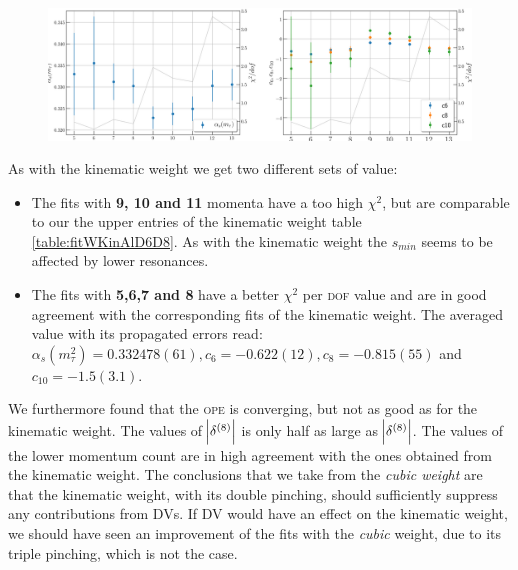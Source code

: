\documentclass[../../index.tex]{subfiles}
\begin{document}
\begin{figure}
  \centering
  \includegraphics[width=\textwidth]{./images/fitWCubeAlD6D8D10.png}
  \label{fig:fitWCubeAlpha}
\end{figure}
As with the kinematic weight we get two different sets of value:
\begin{itemize}
  \item The fits with \textbf{9, 10 and 11} momenta have a too high $\chi^2$,
    but are comparable to our the upper entries of the kinematic weight table
    \cref{table:fitWKinAlD6D8}. As with the kinematic weight the $s_{min}$ seems
    to be affected by lower resonances.
  \item The fits with \textbf{5,6,7 and 8} have a better $\chi^2$ per
    \textsc{dof} value and are in good agreement with the corresponding fits of
    the kinematic weight. The averaged value with its propagated errors read:
    $\alpha_s(m_\tau^2)=0.332478(61), c_6=-0.622(12), c_8=-0.815(55)$ and $c_{10}=-1.5(3.1)$.
\end{itemize}
We furthermore found that the \textsc{ope} is converging, but not as good as for
the kinematic weight. The values of $\abs{\delta^{(8)}}$ is only half as large
as $\abs{\delta^{(8)}}$.
The values of the lower momentum count are in high agreement with the
ones obtained from the kinematic weight. The
conclusions that we take from the \textit{cubic weight} are that the kinematic
weight, with its double pinching, should sufficiently suppress any contributions
from \textsc{DV}s. If \textsc{DV} would have an effect on the kinematic weight,
we should have seen an improvement of the fits with the \textit{cubic} weight,
due to its triple pinching, which is not the case.
\end{document}
